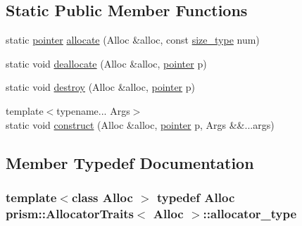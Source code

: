 \subsection*{Static Public Member Functions}
\begin{DoxyCompactItemize}
\item 
static \hyperlink{structprism_1_1_allocator_traits_aed8a12c05f82e96f45db30e9511fa62d}{pointer} \hyperlink{structprism_1_1_allocator_traits_abef54ae79a32109024e69589b0de3a52}{allocate} (Alloc \&alloc, const \hyperlink{structprism_1_1_allocator_traits_a7cf55823ae63bccb9cf50b1e08619363}{size\+\_\+type} num)
\item 
static void \hyperlink{structprism_1_1_allocator_traits_a3db6e004fc0b1c373cb732f659dea2f3}{deallocate} (Alloc \&alloc, \hyperlink{structprism_1_1_allocator_traits_aed8a12c05f82e96f45db30e9511fa62d}{pointer} p)
\item 
static void \hyperlink{structprism_1_1_allocator_traits_a2de651b66415d19edd979914c194b599}{destroy} (Alloc \&alloc, \hyperlink{structprism_1_1_allocator_traits_aed8a12c05f82e96f45db30e9511fa62d}{pointer} p)
\item 
{\footnotesize template$<$typename... Args$>$ }\\static void \hyperlink{structprism_1_1_allocator_traits_a95a22de48ba7899a021f1f1fb4420e8f}{construct} (Alloc \&alloc, \hyperlink{structprism_1_1_allocator_traits_aed8a12c05f82e96f45db30e9511fa62d}{pointer} p, Args \&\&...args)
\end{DoxyCompactItemize}


\subsection{Member Typedef Documentation}
\subsubsection[{\texorpdfstring{allocator\+\_\+type}{allocator_type}}]{\setlength{\rightskip}{0pt plus 5cm}template$<$class Alloc $>$ typedef Alloc {\bf prism\+::\+Allocator\+Traits}$<$ Alloc $>$\+::{\bf allocator\+\_\+type}}\hypertarget{structprism_1_1_allocator_traits_a6d687c073652db923f1808e67f550fcd}{}\label{structprism_1_1_allocator_traits_a6d687c073652db923f1808e67f550fcd}
